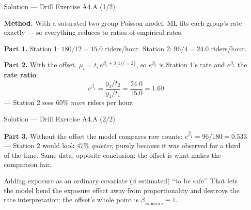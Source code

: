 \documentclass[aspectratio=169,11pt]{beamer}
\begin{document}
\begin{frame}{Solution --- Drill Exercise A4.A (1/2)}
\begin{solutionbox}
  \textbf{Method.} With a saturated two-group Poisson model, ML fits each group's rate
  exactly --- so everything reduces to ratios of empirical rates.

  \textbf{Part 1.} Station 1: $180/12 = \mathbf{15.0}$ riders/hour.
  Station 2: $96/4 = \mathbf{24.0}$ riders/hour.

  \textbf{Part 2.} With the offset, $\mu_i = t_i\, e^{\beta_0 + \beta_1\mathbb{1}\{i=2\}}$,
  so $e^{\beta_0}$ is Station 1's rate and $e^{\beta_1}$ the \textbf{rate ratio}:
  \[
    e^{\hat\beta_1} = \frac{y_2/t_2}{y_1/t_1} = \frac{24.0}{15.0} = \mathbf{1.60}
  \]
  --- Station 2 sees $60\%$ \emph{more} riders per hour.
\end{solutionbox}
\end{frame}

\begin{frame}{Solution --- Drill Exercise A4.A (2/2)}
\begin{solutionbox}
  \textbf{Part 3.} Without the offset the model compares raw counts:
  $e^{\hat\beta_1} = 96/180 = \mathbf{0.533}$ --- Station 2 would look $47\%$
  \emph{quieter}, purely because it was observed for a third of the time. Same data,
  opposite conclusion; the offset is what makes the comparison fair.
\end{solutionbox}
\begin{mistake}
  Adding exposure as an ordinary covariate ($\beta$ estimated) ``to be safe''. That
  lets the model bend the exposure effect away from proportionality and destroys the
  rate interpretation; the offset's whole point is $\beta_{\text{exposure}} \equiv 1$.
\end{mistake}
\end{frame}
\end{document}
